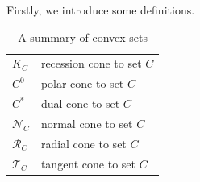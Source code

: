 \documentclass{beamerswitch}
\begin{document}
Firstly, we introduce some definitions.
\begin{table}[h!]
    \centering
    \begin{tabular}{l|l}
        \(K_C\)          & recession cone  to set \(C\) \\
        \(C^0\)          & polar cone to set \(C\)      \\
        \(C^*\)          & dual cone to set \(C\)       \\
        \(\mathcal N_C\) & normal cone to set \(C\)     \\
        \(\mathcal R_C\) & radial cone to set \(C\)     \\
        \(\mathcal T_C\) & tangent cone to set \(C\)
    \end{tabular}
    \caption{A summary of convex sets}
\end{table}
\end{document}
